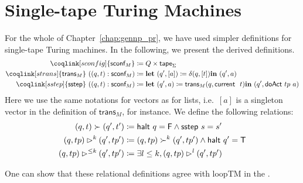 \section{Single-tape Turing Machines}
For the whole of Chapter~\ref{chap:gennp_pr}, we have used simpler definitions for single-tape Turing machines. 
In the following, we present the derived definitions. 
\begin{align*}
  \coqlink[sconfig]{\textsf{sconf}_M} &\defeq Q \times \textsf{tape}_\Sigma \\
  \coqlink[strans]{\textsf{trans}_M}~((q, t) : \textsf{sconf}_M) &\defeq \llet (q', [a]) \defeq \delta (q, [t]) \lin (q', a) \\
  \coqlink[sstep]{\textsf{sstep}}~((q, t) : \textsf{sconf}_M) &\defeq \llet (q', a) \defeq \textsf{trans}_M (q, \tmcurrent~t) \lin (q', \textsf{doAct}~tp~a) 
\end{align*}
Here we use the same notations for vectors as for lists, i.e.\ $[a]$ is a singleton vector in the definition of $\textsf{trans}_M$, for instance.
We define the following relations: 
\begin{align*}
  (q, t) \succ (q', t') &\coloneqq \textsf{halt}~q = \mathsf{F} \land \textsf{sstep}~s = s' \\
  (q, tp) \rhd^{k} (q', tp') &\coloneqq (q, tp) \succ^k (q', tp') \land \textsf{halt}~q' = \mathsf{T}\\
  (q, tp) \rhd^{\le k} (q', tp') &\coloneqq \exists l \le k, (q, tp) \rhd^l (q', tp')
\end{align*}

One can show that these relational definitions agree with \textsf{loopTM} in the  . 

